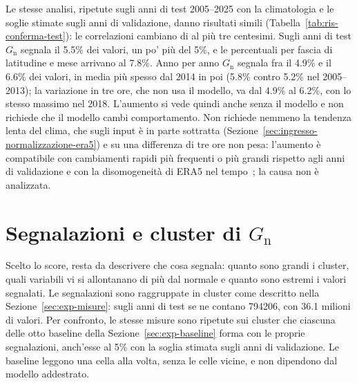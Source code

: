 Le stesse analisi, ripetute sugli anni di test 2005--2025 con la climatologia e le soglie stimate sugli anni di validazione, danno risultati simili (Tabella~\ref{tab:ris-conferma-test}): le correlazioni cambiano di al più tre centesimi. Sugli anni di test $G_{\mathrm{n}}$ segnala il 5.5\% dei valori, un po' più del 5\%, e le percentuali per fascia di latitudine e mese arrivano al 7.8\%. Anno per anno $G_{\mathrm{n}}$ segnala fra il 4.9\% e il 6.6\% dei valori, in media più spesso dal 2014 in poi (5.8\% contro 5.2\% nel 2005--2013); la variazione in tre ore, che non usa il modello, va dal 4.9\% al 6.2\%, con lo stesso massimo nel 2018. L'aumento si vede quindi anche senza il modello e non richiede che il modello cambi comportamento. Non richiede nemmeno la tendenza lenta del clima, che sugli input è in parte sottratta (Sezione~\ref{sec:ingresso-normalizzazione-era5}) e su una differenza di tre ore non pesa: l'aumento è compatibile con cambiamenti rapidi più frequenti o più grandi rispetto agli anni di validazione e con la disomogeneità di ERA5 nel tempo~\cite{hersbach2020era5}; la causa non è analizzata.



\FloatBarrier
\section{Segnalazioni e cluster di $G_{\mathrm{n}}$}
\label{sec:ris-eventi}

Scelto lo score, resta da descrivere che cosa segnala: quanto sono grandi i cluster, quali variabili vi si allontanano di più dal normale e quanto sono estremi i valori segnalati. Le segnalazioni sono raggruppate in cluster come descritto nella Sezione~\ref{sec:exp-misure}: sugli anni di test se ne contano 794206, con 36.1 milioni di valori. Per confronto, le stesse misure sono ripetute sui cluster che ciascuna delle otto baseline della Sezione~\ref{sec:exp-baseline} forma con le proprie segnalazioni, anch'esse al 5\% con la soglia stimata sugli anni di validazione. Le baseline leggono una cella alla volta, senza le celle vicine, e non dipendono dal modello addestrato.

